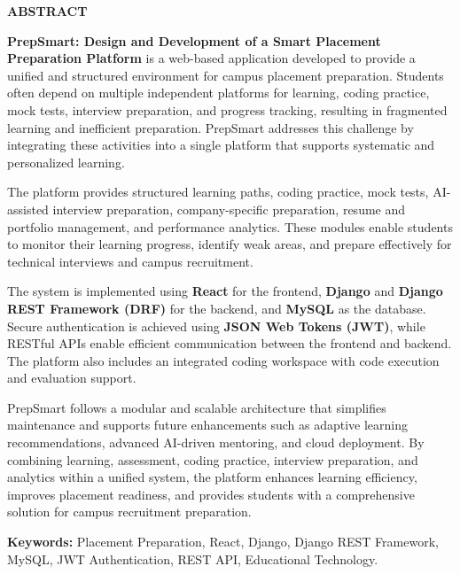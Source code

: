 \thispagestyle{plain}

\begin{center}
{\Large\bfseries\uppercase{Abstract}}
\end{center}

\vspace{0.4cm}

\justify

\textbf{PrepSmart: Design and Development of a Smart Placement Preparation Platform} is a web-based application developed to provide a unified and structured environment for campus placement preparation. Students often depend on multiple independent platforms for learning, coding practice, mock tests, interview preparation, and progress tracking, resulting in fragmented learning and inefficient preparation. PrepSmart addresses this challenge by integrating these activities into a single platform that supports systematic and personalized learning.

\vspace{0.3cm}

The platform provides structured learning paths, coding practice, mock tests, AI-assisted interview preparation, company-specific preparation, resume and portfolio management, and performance analytics. These modules enable students to monitor their learning progress, identify weak areas, and prepare effectively for technical interviews and campus recruitment.

\vspace{0.3cm}

The system is implemented using \textbf{React} for the frontend, \textbf{Django} and \textbf{Django REST Framework (DRF)} for the backend, and \textbf{MySQL} as the database. Secure authentication is achieved using \textbf{JSON Web Tokens (JWT)}, while RESTful APIs enable efficient communication between the frontend and backend. The platform also includes an integrated coding workspace with code execution and evaluation support.

\vspace{0.3cm}

PrepSmart follows a modular and scalable architecture that simplifies maintenance and supports future enhancements such as adaptive learning recommendations, advanced AI-driven mentoring, and cloud deployment. By combining learning, assessment, coding practice, interview preparation, and analytics within a unified system, the platform enhances learning efficiency, improves placement readiness, and provides students with a comprehensive solution for campus recruitment preparation.

\vspace{0.4cm}

\noindent\textbf{Keywords:} Placement Preparation, React, Django, Django REST Framework, MySQL, JWT Authentication, REST API, Educational Technology.

\newpage